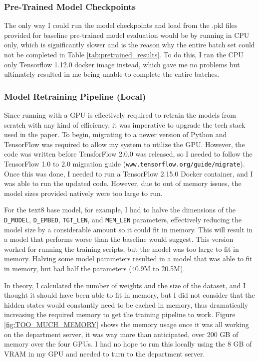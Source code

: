 \documentclass[11pt]{article}
\begin{document}
\subsubsection{Pre-Trained Model Checkpoints}

The only way I could run the model checkpoints and load from the .pkl files provided for baseline pre-trained model evaluation would be by running in CPU only, which is significantly slower and is the reason why the entire batch set could not be completed in Table \ref{tab:pretrained_results}. To do this, I ran the CPU only Tensorflow 1.12.0 docker image instead, which gave me no problems but ultimately resulted in me being unable to complete the entire batches.

\subsubsection{Model Retraining Pipeline (Local)}

Since running with a GPU is effectively required to retrain the models from scratch with any kind of efficiency, it was imperative to upgrade the tech stack used in the paper. To begin, migrating to a newer version of Python and TensorFlow was required to allow my system to utilize the GPU. However, the code was written before TensforFlow 2.0.0 was released, so I needed to follow the TensorFlow 1.0 to 2.0 migration guide (\verb|www.tensorflow.org/guide/migrate|). Once this was done, I needed to run a TensorFlow 2.15.0 Docker container, and I was able to run the updated code. However, due to out of memory issues, the model sizes provided natively were too large to run. 

For the text8 base model, for example, I had to halve the dimensions of the \verb|D_MODEL|, \verb|D_EMBED|, \verb|TGT_LEN|, and \verb|MEM_LEN| parameters, effectively reducing the model size by a considerable amount so it could fit in memory. This will result in a model that performs worse than the baseline would suggest. This version worked for running the training scripts, but the model was too large to fit in memory. Halving some model parameters resulted in a model that was able to fit in memory, but had half the parameters (40.9M to 20.5M). 

In theory, I calculated the number of weights and the size of the dataset, and I thought it should have been able to fit in memory, but I did not consider that the hidden states would constantly need to be cached in memory, thus dramatically increasing the required memory to get the training pipeline to work. Figure \ref{fig:TOO_MUCH_MEMORY} shows the memory usage once it was all working on the department server, it was way more than anticipated, over 200 GB of memory over the four GPUs. I had no hope to run this locally using the 8 GB of VRAM in my GPU and needed to turn to the department server.
\end{document}
